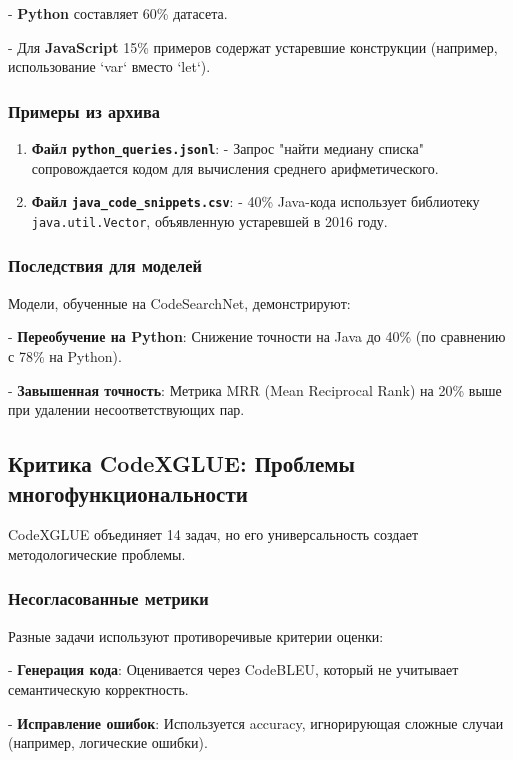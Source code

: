 \documentclass[14pt]{article}
\theoremstyle{definition}
\begin{document}
    
- \textbf{Python} составляет 60\% датасета.
    
- Для \textbf{JavaScript} 15\% примеров содержат устаревшие конструкции (например, использование `var` вместо `let`).


\subsubsection{Примеры из архива}

\begin{enumerate}
    \item \textbf{Файл \texttt{python\_queries.jsonl}}:  
      - Запрос "найти медиану списка" сопровождается кодом для вычисления среднего арифметического.
    \item \textbf{Файл \texttt{java\_code\_snippets.csv}}:  
      - 40\% Java-кода использует библиотеку \texttt{java.util.Vector}, объявленную устаревшей в 2016 году.
\end{enumerate}

\subsubsection{Последствия для моделей}

Модели, обученные на CodeSearchNet, демонстрируют:

    
- \textbf{Переобучение на Python}: Снижение точности на Java до 40\% (по сравнению с 78\% на Python).
    
- \textbf{Завышенная точность}: Метрика MRR (Mean Reciprocal Rank) на 20\% выше при удалении несоответствующих пар.


\subsection{Критика CodeXGLUE: Проблемы многофункциональности}

CodeXGLUE \cite{codexglue} объединяет 14 задач, но его универсальность создает методологические проблемы.

\subsubsection{Несогласованные метрики}

Разные задачи используют противоречивые критерии оценки:

    
- \textbf{Генерация кода}: Оценивается через CodeBLEU, который не учитывает семантическую корректность.
    
- \textbf{Исправление ошибок}: Используется accuracy, игнорирующая сложные случаи (например, логические ошибки).
\end{document}
